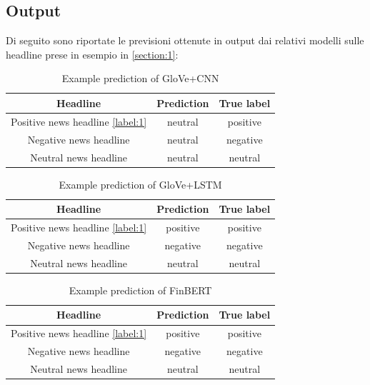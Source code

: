 \subsection{Output}
Di seguito sono riportate le previsioni ottenute in output dai relativi modelli sulle headline prese in esempio in \ref{section:1}:
    \begin{table}[!ht]
    \centering
    \caption{Example prediction of GloVe+CNN}
    \begin{tabular}{ccc}
      \toprule
          Headline &  Prediction & True label \\
          \midrule
          Positive news headline \ref{label:1} & neutral & positive \\
          Negative news headline & neutral & negative \\
          Neutral news headline & neutral & neutral \\
          \bottomrule
    \end{tabular}
  \end{table}

    \begin{table}[!ht]
    \centering
    \caption{Example prediction of GloVe+LSTM}
    \begin{tabular}{ccc}
      \toprule
          Headline &  Prediction & True label \\
          \midrule
          Positive news headline \ref{label:1} & positive & positive \\
          Negative news headline & negative & negative \\
          Neutral news headline & neutral & neutral \\
          \bottomrule
    \end{tabular}
  \end{table}

\begin{table}[!ht]
    \centering
    \caption{Example prediction of FinBERT}
    \begin{tabular}{ccc}
      \toprule
          Headline &  Prediction & True label \\
          \midrule
          Positive news headline \ref{label:1} & positive & positive \\
          Negative news headline & negative & negative \\
          Neutral news headline & neutral & neutral \\
          \bottomrule
    \end{tabular}
  \end{table}

